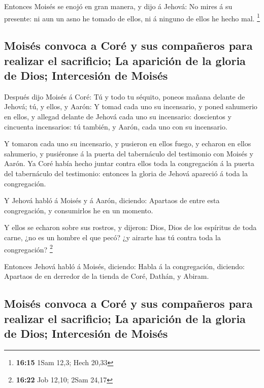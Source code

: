  Entonces Moisés se enojó en gran manera, y dijo á
Jehová: No mires á su presente: ni aun un asno he tomado de ellos, ni á
ninguno de ellos he hecho mal. \footnote{\textbf{16:15} 1Sam 12,3; Hech
  20,33}

\hypertarget{moisuxe9s-convoca-a-coruxe9-y-sus-compauxf1eros-para-realizar-el-sacrificio-la-apariciuxf3n-de-la-gloria-de-dios-intercesiuxf3n-de-moisuxe9s}{%
\subsection{Moisés convoca a Coré y sus compañeros para realizar el
sacrificio; La aparición de la gloria de Dios; Intercesión de
Moisés}\label{moisuxe9s-convoca-a-coruxe9-y-sus-compauxf1eros-para-realizar-el-sacrificio-la-apariciuxf3n-de-la-gloria-de-dios-intercesiuxf3n-de-moisuxe9s}}

 Después dijo Moisés á Coré: Tú y todo tu séquito, poneos
mañana delante de Jehová; tú, y ellos, y Aarón:  Y tomad
cada uno su incensario, y poned sahumerio en ellos, y allegad delante de
Jehová cada uno su incensario: doscientos y cincuenta incensarios: tú
también, y Aarón, cada uno con su incensario.

 Y tomaron cada uno su incensario, y pusieron en ellos
fuego, y echaron en ellos sahumerio, y pusiéronse á la puerta del
tabernáculo del testimonio con Moisés y Aarón.  Ya Coré
había hecho juntar contra ellos toda la congregación á la puerta del
tabernáculo del testimonio: entonces la gloria de Jehová apareció á toda
la congregación.

 Y Jehová habló á Moisés y á Aarón, diciendo:
 Apartaos de entre esta congregación, y consumirlos he en
un momento.

 Y ellos se echaron sobre sus rostros, y dijeron: Dios,
Dios de los espíritus de toda carne, ¿no es un hombre el que pecó? ¿y
airarte has tú contra toda la congregación? \footnote{\textbf{16:22} Job
  12,10; 2Sam 24,17}

 Entonces Jehová habló á Moisés, diciendo:
 Habla á la congregación, diciendo: Apartaos de en
derredor de la tienda de Coré, Dathán, y Abiram.

\hypertarget{moisuxe9s-convoca-a-coruxe9-y-sus-compauxf1eros-para-realizar-el-sacrificio-la-apariciuxf3n-de-la-gloria-de-dios-intercesiuxf3n-de-moisuxe9s-1}{%
\subsection{Moisés convoca a Coré y sus compañeros para realizar el
sacrificio; La aparición de la gloria de Dios; Intercesión de
Moisés}\label{moisuxe9s-convoca-a-coruxe9-y-sus-compauxf1eros-para-realizar-el-sacrificio-la-apariciuxf3n-de-la-gloria-de-dios-intercesiuxf3n-de-moisuxe9s-1}}

